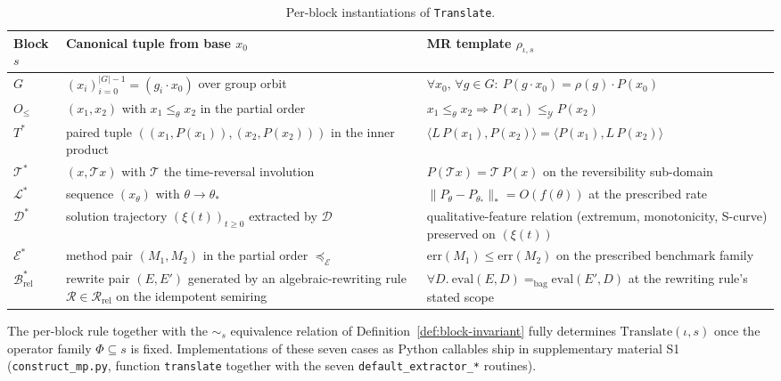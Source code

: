 \documentclass[acmsmall, screen]{acmart}
\begin{document}
\begin{table}[h]
\centering
\caption{Per-block instantiations of \texttt{Translate}.}
\label{tab:translate}
\footnotesize
\begin{tabular}{p{} p{} p{}}
\toprule
\textbf{Block} $s$ & \textbf{Canonical tuple from base $x_0$} & \textbf{MR template $\rho_{\iota,s}$} \\
\midrule
$G$ & $(x_i)_{i=0}^{|G|-1} = (g_i \cdot x_0)$ over group orbit & $\forall x_0,\, \forall g \in G:\ P(g\cdot x_0) = \rho(g)\cdot P(x_0)$ \\
$O_{\le}$ & $(x_1, x_2)$ with $x_1 \le_{\theta} x_2$ in the partial order & $x_1 \le_\theta x_2 \Rightarrow P(x_1) \le_{\mathcal{Y}} P(x_2)$ \\
$T^{*}$ & paired tuple $((x_1, P(x_1)), (x_2, P(x_2)))$ in the inner product & $\langle L\,P(x_1), P(x_2)\rangle = \langle P(x_1), L\,P(x_2)\rangle$ \\
$\mathcal{T}^{*}$ & $(x, \mathcal{T} x)$ with $\mathcal{T}$ the time-reversal involution & $P(\mathcal{T} x) = \mathcal{T}\,P(x)$ on the reversibility sub-domain \\
$\mathcal{L}^{*}$ & sequence $(x_\theta)$ with $\theta \to \theta_*$ & $\|P_{\theta} - P_{\theta_*}\|_{*} = O(f(\theta))$ at the prescribed rate \\
$\mathcal{D}^{*}$ & solution trajectory $(\xi(t))_{t \ge 0}$ extracted by $\mathcal{D}$ & qualitative-feature relation (extremum, monotonicity, S-curve) preserved on $(\xi(t))$ \\
$\mathcal{E}^{*}$ & method pair $(M_1, M_2)$ in the partial order $\preceq_{\mathcal{E}}$ & $\mathrm{err}(M_1) \le \mathrm{err}(M_2)$ on the prescribed benchmark family \\
$\mathcal{B}^{*}_{\mathrm{rel}}$ & rewrite pair $(E, E')$ generated by an algebraic-rewriting rule $\mathcal{R} \in \mathcal{R}_{\mathrm{rel}}$ on the idempotent semiring & $\forall D.\ \mathrm{eval}(E, D) =_{\mathrm{bag}} \mathrm{eval}(E', D)$ at the rewriting rule's stated scope \\
\bottomrule
\end{tabular}
\end{table}

The per-block rule together with the $\sim_s$ equivalence relation of Definition~\ref{def:block-invariant} fully determines $\mathrm{Translate}(\iota, s)$ once the operator family $\Phi \subseteq s$ is fixed. Implementations of these seven cases as Python callables ship in supplementary material S1 (\texttt{construct\_mp.py}, function \texttt{translate} together with the seven \texttt{default\_extractor\_*} routines).
\end{document}

